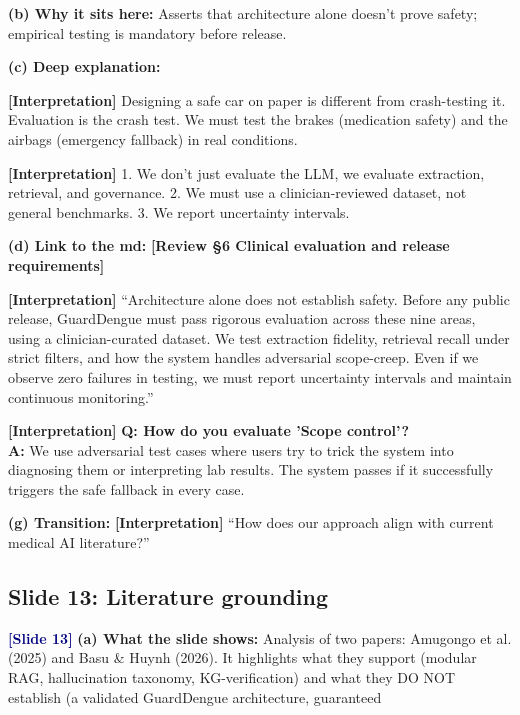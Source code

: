 \documentclass[11pt,a4paper]{article}
\newcommand{\origintag}[2]{\textcolor{#1}{\small\textbf{[#2]}}}
\begin{document}
\textbf{(b) Why it sits here:} Asserts that architecture alone doesn't prove safety; empirical testing is mandatory before release.

\textbf{(c) Deep explanation:}
\begin{analogy}
\origintag{slate}{Interpretation} Designing a safe car on paper is different from crash-testing it. Evaluation is the crash test. We must test the brakes (medication safety) and the airbags (emergency fallback) in real conditions.
\end{analogy}
\origintag{slate}{Interpretation} 1. We don't just evaluate the LLM, we evaluate extraction, retrieval, and governance. 2. We must use a clinician-reviewed dataset, not general benchmarks. 3. We report uncertainty intervals.

\textbf{(d) Link to the md:} \origintag{amber}{Review \S6 Clinical evaluation and release requirements}

\begin{sayit}
\origintag{slate}{Interpretation} ``Architecture alone does not establish safety. Before any public release, GuardDengue must pass rigorous evaluation across these nine areas, using a clinician-curated dataset. We test extraction fidelity, retrieval recall under strict filters, and how the system handles adversarial scope-creep. Even if we observe zero failures in testing, we must report uncertainty intervals and maintain continuous monitoring.''
\end{sayit}

\begin{qa}
\origintag{slate}{Interpretation} \textbf{Q: How do you evaluate 'Scope control'?} \\
\textbf{A:} We use adversarial test cases where users try to trick the system into diagnosing them or interpreting lab results. The system passes if it successfully triggers the safe fallback in every case.
\end{qa}
\textbf{(g) Transition:} \origintag{slate}{Interpretation} ``How does our approach align with current medical AI literature?''

\subsection{Slide 13: Literature grounding}
\origintag{navy}{Slide 13}
\textbf{(a) What the slide shows:} Analysis of two papers: Amugongo et al. (2025) and Basu \& Huynh (2026). It highlights what they support (modular RAG, hallucination taxonomy, KG-verification) and what they DO NOT establish (a validated GuardDengue architecture, guaranteed %
\end{document}
